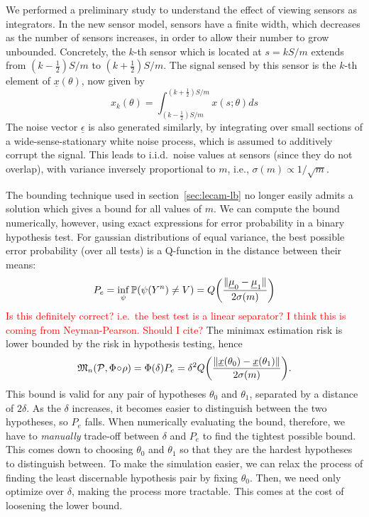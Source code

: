 \documentclass[conference]{IEEEtran}
\providecommand{\v}{}
\renewcommand{\v}[1]{\underline{#1}}
\DeclarePairedDelimiter\norm{\lVert}{\rVert}
\newcommand{\Phiorho}{\Phi\!\circ\!\rho}
\begin{document}
We performed a preliminary study to understand the effect of viewing sensors
as integrators. In the new sensor model, sensors have a finite width, which
decreases as the number of sensors increases, in order to allow their number to
grow unbounded. Concretely, the $k$-th sensor which is located at $s = kS/m$
extends from $(k{-}\frac{1}{2})S/m$ to $(k{+}\frac{1}{2})S/m$. The signal
sensed by this sensor is the $k$-th element of $\v x(\theta)$, now given by
\begin{equation}
	x_k(\theta) = \int_{(k-\frac{1}{2})S/m}^{(k+\frac{1}{2})S/m} x(s;\theta) ds
\end{equation}
The noise vector $\v \epsilon$ is also generated similarly, by integrating over
small sections of a wide-sense-stationary white noise process, which is assumed
to additively corrupt the signal. This leads to i.i.d.\ noise values at sensors
(since they do not overlap), with variance inversely proportional to $m$, i.e.,
$\sigma(m) \propto 1/\sqrt{m}$.

The bounding technique used in section~\ref{sec:lecam-lb} no longer easily
admits a solution which gives a bound for all values of $m$. We can compute the
bound numerically, however, using exact expressions for error probability in a
binary hypothesis test. For gaussian distributions of equal variance, the best
possible error probability (over all tests) is a Q-function in the distance
between their means:
\begin{equation}
	P_e = \inf_\psi \mathbb P(\psi(Y^n) \neq V) = Q\bigg(\frac{\norm{\v\mu_0 - \v\mu_1}}{2\sigma(m)}\bigg)
\end{equation}
\textcolor{red}{Is this definitely correct? i.e.\ the best test is a linear
separator? I think this is coming from Neyman-Pearson. Should I cite?}
The minimax estimation risk is lower bounded by the risk in hypothesis testing,
hence
\begin{equation}
	\mathfrak{M}_n(\mathcal{P}, \Phiorho) = \Phi(\delta) P_e = \delta^2 Q\bigg(\frac{\norm{\v x(\theta_0) - \v x(\theta_1)}}{2\sigma(m)}\bigg).
\end{equation}
This bound is valid for any pair of hypotheses $\theta_0$ and $\theta_1$,
separated by a distance of $2\delta$. As the $\delta$ increases, it becomes
easier to distinguish between the two hypotheses, so $P_e$ falls. When
numerically evaluating the bound, therefore, we have to \emph{manually}
trade-off between $\delta$ and $P_e$ to find the tightest possible bound. This
comes down to choosing $\theta_0$ and $\theta_1$ so that they are the hardest
hypotheses to distinguish between. To make the simulation easier, we can relax
the process of finding the least discernable hypothesis pair by fixing
$\theta_0$. Then, we need only optimize over $\delta$, making the process more
tractable. This comes at the cost of loosening the lower bound.
\end{document}
